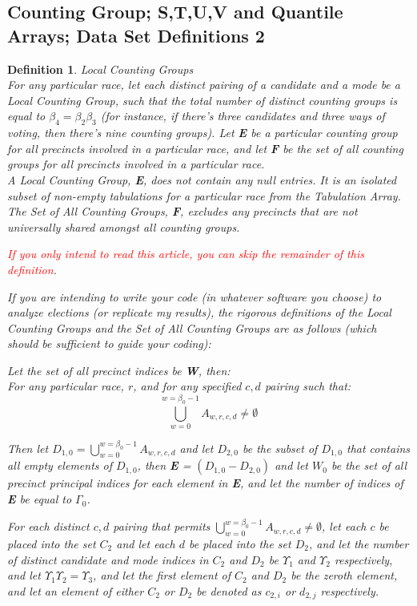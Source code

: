 \documentclass[preprint,13pt]{elsarticle}
\newtheorem{definition}{Definition}[section]
\begin{document}
\subsection{Counting Group; S,T,U,V and Quantile Arrays; Data Set Definitions 2}
\begin{definition}{Local Counting Groups}\\
For any particular race, let each distinct pairing of a candidate and a mode be a Local Counting Group, such that the total number of distinct counting groups is equal to $\beta_{4}=\beta_{2}\beta_{3}$ (for instance, if there's three candidates and three ways of voting, then there's nine counting groups). Let \textbf{E} be a particular counting group for all precincts involved in a particular race, and let \textbf{F} be the set of all counting groups for all precincts involved in a particular race.\\

A Local Counting Group, \textbf{E}, does not contain any null entries. It is an isolated subset of non-empty tabulations for a particular race from the Tabulation Array. The Set of All Counting Groups, \textbf{F}, excludes any precincts that are not universally shared amongst all counting groups.

\textcolor{red}{If you only intend to read this article, you can skip the remainder of this definition}. 

If you are intending to write your code (in whatever software you choose) to analyze elections (or replicate my results), the rigorous definitions of the Local Counting Groups and the Set of All Counting Groups are as follows (which should be sufficient to guide your coding):

Let the set of all precinct indices be \textbf{W}, then:\\
For any particular race, $r$, and for any specified $c,d$ pairing such that:
$$\bigcup_{w=0}^{w=\beta_{0}-1}A_{w,r,c,d}\neq\emptyset$$

Then let $D_{1,0}=\bigcup_{w=0}^{w=\beta_{0}-1}A_{w,r,c,d}$ and let $D_{2,0}$ be the subset of $D_{1,0}$ that contains all empty elements of $D_{1,0}$, then \textbf{E} = $(D_{1,0}-D_{2,0})$ and let $W_{0}$ be the set of all precinct principal indices for each element in \textbf{E}, and let the number of indices of \textbf{E} be equal to $\Gamma_{0}$.

For each distinct $c,d$ pairing that permits $\bigcup_{w=0}^{w=\beta_{0}-1}A_{w,r,c,d}\neq\emptyset$, let each $c$ be placed into the set $C_{2}$ and let each $d$ be placed into the set $D_{2}$, and let the number of distinct candidate and mode indices in $C_{2}$ and $D_{2}$ be $\Upsilon_{1}$ and $\Upsilon_{2}$ respectively, and let $\Upsilon_{1} \Upsilon_{2}=\Upsilon_{3}$, and let the first element of $C_{2}$ and $D_{2}$ be the zeroth element, and let an element of either $C_{2}$ or $D_{2}$ be denoted as $c_{2,i}$ or $d_{2,j}$ respectively.


\end{definition}
\end{document}

